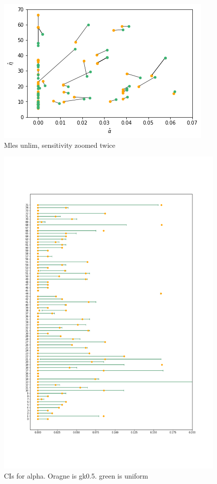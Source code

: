 \begin{figure}
    \centering
    \includegraphics[scale=0.8]{pictures/Sensitivity/mles_unlim_zoom2.png}
    \caption{Mles unlim, sensitivity zoomed twice}
    \label{fig:sensitivity_mls_unlim_zoom2}
\end{figure}


\begin{figure}
    \centering
    \includegraphics[scale=0.37]{pictures/Sensitivity/ci_unlim_alpha.png}
    \caption{CIs for alpha. Oragne is gk0.5. green is uniform}
    \label{fig:sensitivity_unlim_cis_alpha}
\end{figure}


